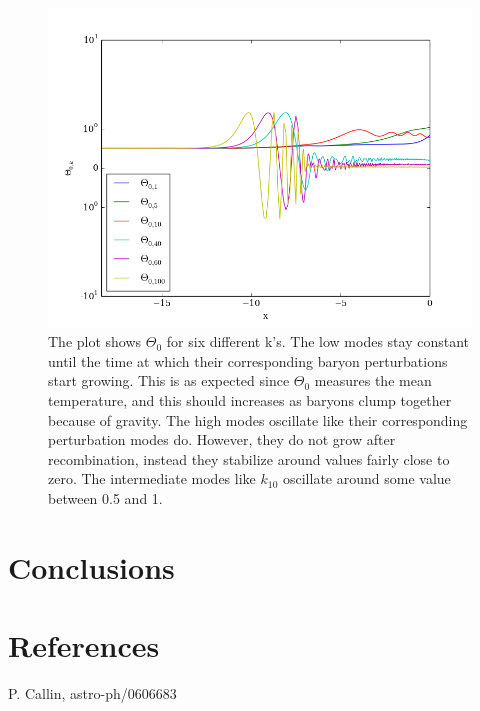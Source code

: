 \documentclass[a4paper]{report}
\begin{document}
\begin{figure}
 \includegraphics[width=\textwidth]{Theta0.png}
 \caption{The plot shows $\Theta_0$ for six different k's. The low modes stay constant until the time at which their corresponding baryon perturbations start growing. This is as expected since $\Theta_0$ measures the mean temperature, and this should increases as baryons clump together because of gravity. The high modes oscillate like their corresponding perturbation modes do. However, they do not grow after recombination, instead they stabilize around values fairly close to zero. The intermediate modes like $k_10$ oscillate around some value between 0.5 and 1.}
 \label{fig:Theta0}
\end{figure}





\section{Conclusions} \label{sec:conclusions}

\section{References}
\begin{enumerate}[label= {[}\arabic*{]} ]
 \item P. Callin, astro-ph/0606683
\end{enumerate}
\end{document}

